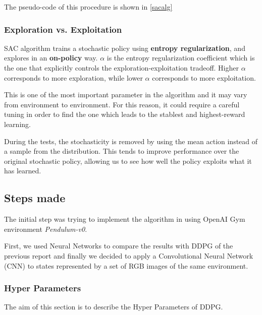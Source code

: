 \documentclass[a4paper, 11pt]{article}
\begin{document}
	The pseudo-code of this procedure is shown in \vref{sacalg}
	
	\subsubsection{Exploration vs. Exploitation} 
	SAC algorithm trains a stochastic policy using \textbf{entropy regularization}, and explores in an \textbf{on-policy} way. $\alpha$ is the entropy regularization coefficient which is the one that explicitly controls the exploration-exploitation tradeoff. Higher $\alpha$ corresponds to more exploration, while lower $\alpha$ corresponds to more exploitation.
	
	This is one of the most important parameter in the algorithm and it may vary from environment to environment. For this reason, it could require a careful tuning in order to find the one which leads to the stablest and highest-reward learning.
	
	During the tests, the stochasticity is removed by using the mean action instead of a sample from the distribution. This tends to improve performance over the original stochastic policy, allowing us to see how well the policy exploits what it has learned.
	 
	\subsection{Steps made}
	The initial step was trying to implement the algorithm in \cite{haarnoja2018alg} using OpenAI Gym environment \textit{Pendulum-v0}.
	
	First, we used Neural Networks to compare the results with DDPG of the previous report and finally we decided to apply a Convolutional Neural Network (CNN) to states represented by a set of RGB images of the same environment. 
	
	\subsubsection{Hyper Parameters}
	The aim of this section is to describe the Hyper Parameters of DDPG.
	
\end{document}
